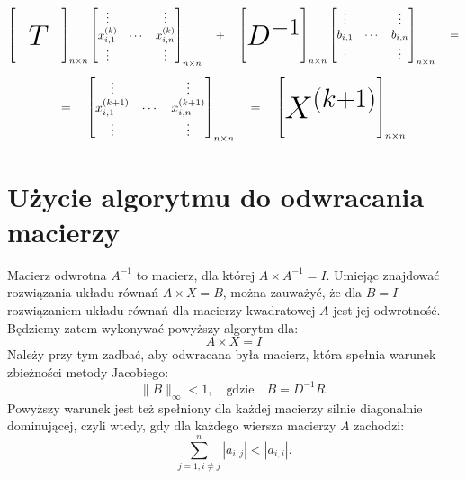 \documentclass[a4paper,margin=1.54cm]{article}
\begin{document}
 \[
 \begin{bmatrix}
    \qquad\qquad \\
    \\
    \raisebox{0pt}[0pt][0pt]{\Huge $T$} \\
    \\
\end{bmatrix}_{n\times n}
 \begin{bmatrix}
    \vdots & & \vdots \\
     x^{(k)}_{i,1} & \cdots & x^{(k)}_{i,n}\\
    \vdots & & \vdots
\end{bmatrix}_{n\times n}
\quad + \quad
\begin{bmatrix}
    \qquad\qquad \\
    \\
    \raisebox{0pt}[0pt][0pt]{\Huge $D^{-1}$} \\
    \\
\end{bmatrix}_{n\times n}
 \begin{bmatrix}
    \vdots & & \vdots \\
     b_{i,1} & \cdots & b_{i,n}\\
    \vdots & & \vdots
\end{bmatrix}_{n\times n}
\quad = 
 \]
\[
=\quad
 \begin{bmatrix}
    \vdots & & \vdots \\
     x^{(k+1)}_{i,1} & \cdots & x^{(k+1)}_{i,n}\\
    \vdots & & \vdots
\end{bmatrix}_{n\times n}
\quad = \quad
\begin{bmatrix}
    \qquad\qquad \\
    \\
    \raisebox{0pt}[0pt][0pt]{\Huge $X^{(k+1)}$} \\
    \\
\end{bmatrix}_{n\times n}
 \]
 
\section{Użycie algorytmu do odwracania macierzy}
Macierz odwrotna $A^{-1}$ to macierz, dla której $A\times A^{-1} = I$.
Umiejąc znajdować rozwiązania układu równań $A\times X = B$, można zauważyć, że dla $B=I$ rozwiązaniem układu równań dla macierzy kwadratowej $A$ jest jej odwrotność. Będziemy zatem wykonywać powyższy algorytm dla:
\[
A\times X = I
\]
Należy przy tym zadbać, aby odwracana była macierz, która spełnia warunek zbieżności metody Jacobiego:
\[
	\|B	\|_\infty < 1, \quad \textrm{gdzie} \quad B = D^{-1}R.
\]
Powyższy warunek jest też spełniony dla każdej macierzy silnie diagonalnie dominującej, czyli wtedy, gdy dla każdego wiersza macierzy $A$ zachodzi:
\[
    \sum_{j=1, i\neq j}^n |a_{i,j}| < |a_{i,i}| \textrm{.}
\]
\end{document}
